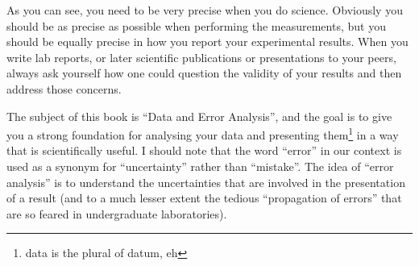 As you can see, you need to be very precise when you do science. Obviously you should be as precise as possible when performing the measurements, but you should be equally precise in how you report your experimental results. When you write lab reports, or later scientific publications or presentations to your peers, always ask yourself how one could question the validity of your results and then address those concerns.

The subject of this book is ``Data and Error Analysis'', and the goal is to give you a strong foundation for analysing your data and presenting them\footnote{data is the plural of datum, eh} in a way that is scientifically useful. I should note that the word ``error'' in our context is used as a synonym for ``uncertainty'' rather than ``mistake''. The idea of ``error analysis'' is to understand the uncertainties that are involved in the presentation of a result (and to a much lesser extent the tedious ``propagation of errors'' that are so feared in undergraduate laboratories).


